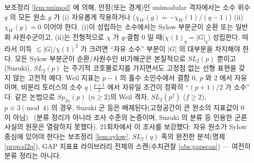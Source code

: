\begin{remark}[왜 하필 $SL_2(p)$ 인가]
보조정리 \ref{lem:unimod} 에 의해, 안정(또는 경계)인 unimodular 격자에서는 소수 위수 $q$ 의 모든 원소 $g$ 가 (i) 자유롭게 작용하거나 ($\chi_W(g)=-\chi_W(1)/(q-1)$) (ii) $\chi_W(g)=0$ 이어야 한다. (i)이 성립하는 소수에서는 Sylow 부분군이 순환 또는 일반화 사원수군이고, (ii)는 전형적으로 $\chi$ 가 $q$-결함 0 일 때($\chi(1)_q=|G|_q$) 성립한다. 따라서 이득 $\lesssim|G|/\chi(1)^2$ 가 크려면 ``자유 소수'' 부분이 $|G|$ 의 대부분을 차지해야 한다. 모든 Sylow 부분군이 순환/사원수인 비가해군은 본질적으로 $SL_2(p)$ 뿐이고(Suzuki), $SL_2(p)$ 는 주기적 코호몰로지를 가지면서도 고정점 없는 선형 표현을 갖지 않는 고전적 예다. Weil 지표는 $p-1$ 의 홀수 소인수에서 결함 0, $p$ 와 2 에서 자유이며, 비분리 토러스의 소수 $q\mid\tfrac{p+1}2$ 에서 자유일 조건이 정확히 ``$(p+1)/2$ 가 소수'' 다. 같은 논법으로 $Sp_{2n}(p)$ ($n\ge2$)의 Weil 격자, $SL_2(p^f)$ ($f\ge2$), $p\equiv3\pmod4$ 의 경우, Suzuki 군 등은 배제된다(고정공간이 큰 원소의 지표값이 0 이 아님) \tagH\ (분류 정리가 아니라 조사 수준의 논증이며, Suzuki 의 분류 등 인용한 군론 사실의 원문은 열람하지 못했다). 21회차에서 이 조사를 보강했다: 자유 원소가 Sylow 중심에 있어야 한다는 보조정리 \ref{lem:sylow}, $SL_2(q)$ 족의 완전한 분석(명제 \ref{prop:sl2q}), GAP 지표표 라이브러리 전체의 스캔(수치관찰 \ref{obs:gapscan}) --- 여전히 분류 정리는 아니다.
\end{remark}

